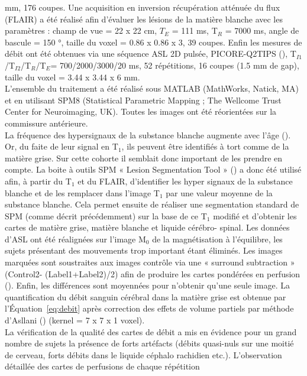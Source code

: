 mm, 176 coupes. Une acquisition en inversion récupération atténuée du flux (FLAIR) a été réalisé afin
d’évaluer les lésions de la matière blanche avec les paramètres : champ de vue = 22 x 22 cm, $T_E$ = 111
ms, T$_R$ = 7000 ms, angle de bascule = 150 °, taille du voxel = 0.86 x 0.86 x 3, 39 coupes. Enfin les mesures
de débit ont été obtenues via une séquence ASL 2D pulsée, PICORE-Q2TIPS (\cite{Luh1999}), T$_{I1}$/T$_{I2}$/T$_{R}$/T$_{E}$=
700/2000/3000/20 ms, 52 répétitions, 16 coupes (1.5 mm de gap), taille du voxel = 3.44 x 3.44 x 6 mm.\\
L’ensemble du traitement a été réalisé sous MATLAB (MathWorks, Natick, MA) et en utilisant
SPM8 (Statistical Parametric Mapping ; The Wellcome Trust Center for Neuroimaging, UK). Toutes les
images ont été réorientées sur la commissure antérieure.\\
La fréquence des hypersignaux de la substance blanche augmente avec l’âge (\cite{Awad1987}). Or, du faite
de leur signal en T$_1$, ils peuvent être identifiés à tort comme de la matière grise. Sur cette cohorte il
semblait donc important de les prendre en compte. La boite à outils SPM « Lesion Segmentation Tool »
(\cite{Schmidt2012}) a donc été utilisé afin, à partir du T$_1$ et du FLAIR, d’identifier les hyper signaux de la substance
blanche et de les remplacer dans l’image T$_1$ par une valeur moyenne de la substance blanche. Cela
permet ensuite de réaliser une segmentation standard de SPM (comme décrit précédemment) sur la
base de ce T$_1$ modifié et d’obtenir les cartes de matière grise, matière blanche et liquide cérébro-
spinal. Les données d’ASL ont été réalignées sur l’image M$_0$ de la magnétisation à l’équilibre, les sujets
présentant des mouvements trop important étant éliminés. Les images marquées sont soustraites aux
images contrôle via une « surround subtraction » (Control2- (Label1+Label2)/2) afin de produire les
cartes pondérées en perfusion (\cite{Wang2008}). Enfin, les différences sont moyennées pour n’obtenir qu’une
seule image. La quantification du débit sanguin cérébral dans la matière grise est obtenue par
l’Équation~\ref{eq:debit} après correction des effets de volume partiels par méthode d’Asllani (\cite{Asllani2008}) (kernel = 7 x
7 x 1 voxel).\\
La vérification de la qualité des cartes de débit a mis en évidence pour un grand nombre de
sujets la présence de forts artéfacts (débits quasi-nuls sur une moitié de cerveau, forts débits dans le
liquide céphalo rachidien etc.). L’observation détaillée des cartes de perfusions de chaque répétition
